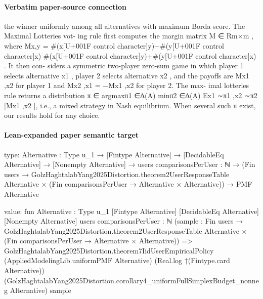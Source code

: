 \documentclass[10pt]{article}
\begin{document}
\paragraph{Verbatim paper-source connection}
\begin{ReviewVerbatim}
the winner uniformly among all alternatives with maximum Borda score. The Maximal Lotteries vot-
ing rule first computes the margin matrix M ∈ Rm×m , where Mx,y = #(x[U+001F control character]y)−#(y[U+001F control character]x)
                                                                          #(x[U+001F control character]y)+#(y[U+001F control character]x) . It then con-
siders a symmetric two-player zero-sum game in which player 1 selects alternative x1 , player 2 selects
alternative x2 , and the payoffs are Mx1 ,x2 for player 1 and Mx2 ,x1 = −Mx1 ,x2 for player 2. The max-
imal lotteries rule returns a distribution π ∈ argmaxπ1 ∈∆(A) minπ2 ∈∆(A) Ex1 ∼π1 ,x2 ∼π2 [Mx1 ,x2 ],
i.e., a mixed strategy in Nash equilibrium. When several such π exist, our results hold for any choice.
\end{ReviewVerbatim}



\paragraph{Lean-expanded paper semantic target}
\begin{ReviewVerbatim}
type:
{Alternative : Type u_1} →
  [Fintype Alternative] →
    [DecidableEq Alternative] →
      [Nonempty Alternative] →
        {users comparisonsPerUser : ℕ} →
          (Fin users →
              GolzHaghtalabYang2025Distortion.theorem2UserResponseTable Alternative ×
                (Fin comparisonsPerUser → Alternative × Alternative)) →
            PMF Alternative

value:
fun {Alternative : Type u_1} [Fintype Alternative] [DecidableEq Alternative] [Nonempty Alternative]
    {users comparisonsPerUser : ℕ}
    (sample :
      Fin users →
        GolzHaghtalabYang2025Distortion.theorem2UserResponseTable Alternative ×
          (Fin comparisonsPerUser → Alternative × Alternative)) =>
  GolzHaghtalabYang2025Distortion.theorem7IidUserEmpiricalPolicy (AppliedModelingLib.uniformPMF Alternative)
    (Real.log ↑(Fintype.card Alternative))
    (GolzHaghtalabYang2025Distortion.corollary4_uniformFullSimplexBudget_nonneg Alternative) sample
\end{ReviewVerbatim}
\end{document}
